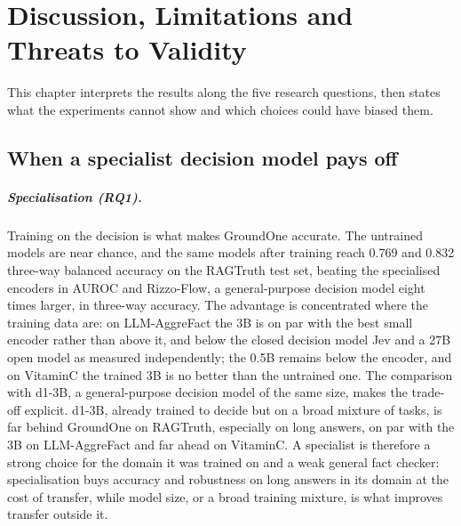\chapter{Discussion, Limitations and Threats to Validity}
\label{sec:discussion}


This chapter interprets the results along the five research questions, then states what the experiments cannot show
and which choices could have biased them.

\section{When a specialist decision model pays off}
\label{sec:disc-synthesis}

\paragraph{Specialisation (RQ1).} Training on the decision is what makes GroundOne accurate. The untrained models are
near chance, and the same models after training reach 0.769 and 0.832 three-way balanced accuracy on the RAGTruth test
set, beating the specialised encoders in AUROC and Rizzo-Flow, a general-purpose decision model eight times larger, in three-way accuracy.
The advantage is concentrated where the training data are: on LLM-AggreFact the 3B is on par with the best small encoder
rather than above it, and below the closed decision model Jev and a 27B open model as measured independently; the 0.5B
remains below the encoder, and on VitaminC the trained 3B is no better than the untrained one. The comparison with d1-3B, a general-purpose decision model of the same size, makes the trade-off explicit. d1-3B, already
trained to decide but on a broad mixture of tasks, is far behind GroundOne on RAGTruth, especially on long answers, on par
with the 3B on LLM-AggreFact and far ahead on VitaminC. A specialist is therefore a strong choice for the domain it was
trained on and a weak general fact checker: specialisation buys accuracy and robustness on long answers in its domain at
the cost of transfer, while model size, or a broad training mixture, is what improves transfer outside it.

